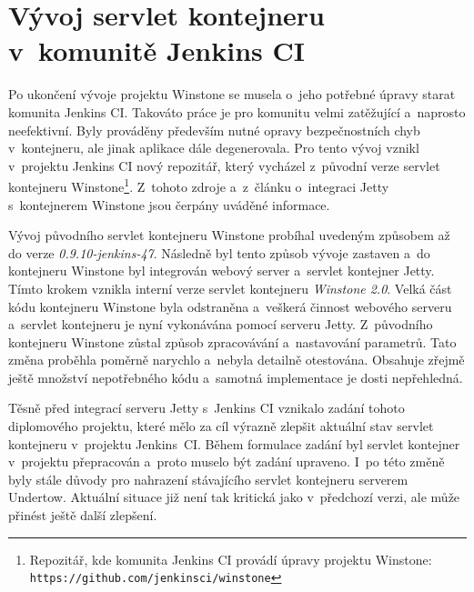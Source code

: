     \section{Vývoj servlet kontejneru v~komunitě Jenkins CI} \label{vyvojWinstone}
        Po ukončení vývoje projektu Winstone se musela o~jeho potřebné úpravy starat komunita
        Jenkins CI. Takováto práce je pro komunitu velmi zatěžující
        a~naprosto neefektivní. Byly prováděny především nutné opravy bezpečnostních chyb v~kontejneru,
        ale jinak aplikace dále degenerovala. Pro tento vývoj vznikl v~projektu Jenkins CI nový 
        repozitář, který vycházel z~původní verze servlet kontejneru 
        Winstone\footnote{Repozitář, kde komunita Jenkins CI provádí úpravy projektu Winstone:
        \texttt{https://github.com/jenkinsci/winstone}}. Z~tohoto zdroje
        a~z~článku o~integraci Jetty s~kontejnerem Winstone \cite{kohsukeTopic} jsou čerpány uváděné informace. 
        
        \medskip
        Vývoj původního servlet kontejneru Winstone probíhal uvedeným způsobem 
        až do verze \emph{0.9.10-jenkins-47}. Následně byl tento způsob vývoje zastaven
        a~do kontejneru Winstone byl integrován webový server a~servlet kontejner
        Jetty. Tímto krokem vznikla 
        interní verze servlet kontejneru \emph{Winstone 2.0}. Velká část kódu 
        kontejneru Winstone byla odstraněna a~veškerá činnost webového serveru a~servlet 
        kontejneru je nyní vykonávána pomocí serveru Jetty. Z~původního kontejneru Winstone
        zůstal způsob zpracovávání a~nastavování parametrů. 
        Tato změna proběhla poměrně narychlo
        a~nebyla detailně otestována. Obsahuje zřejmě ještě množství nepotřebného kódu
        a~samotná implementace je dosti nepřehledná.

        
        \medskip
        Těsně před integrací serveru Jetty s~Jenkins CI
        vznikalo zadání tohoto diplomového projektu, které mělo za cíl
        výrazně zlepšit aktuální stav servlet kontejneru v~projektu Jenkins~CI. Během
        formulace zadání byl servlet kontejner v~projektu přepracován a~proto
        muselo být zadání upraveno. I~po této změně byly stále důvody pro 
        nahrazení stávajícího servlet kontejneru serverem Undertow.
        Aktuální situace již není tak kritická jako v~předchozí verzi,
        ale může přinést ještě další zlepšení.
                

